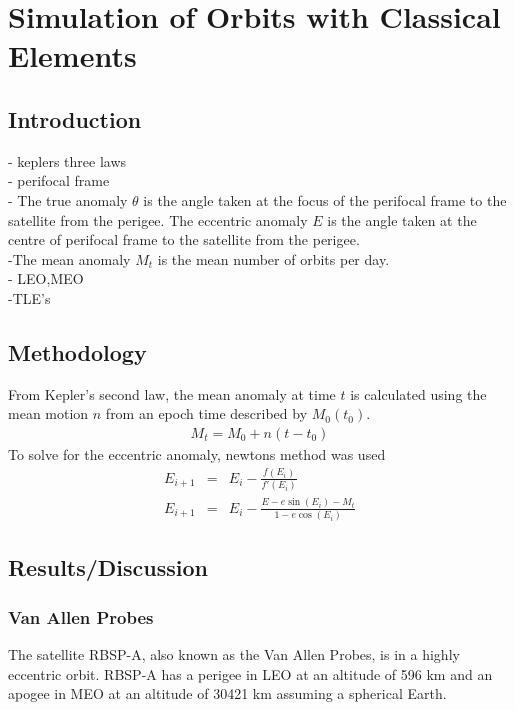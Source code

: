 \documentclass[Space3_Assign1.tex]{subfiles}
\begin{document}
\section{Simulation of Orbits with Classical Elements}
\subsection{Introduction}
- keplers three laws\\
- perifocal frame\\
- The true anomaly $\theta$ is the angle taken at the focus of the perifocal frame to the satellite from the perigee. The eccentric anomaly $\textit{E}$ is the angle taken at the centre of perifocal frame to the satellite from the perigee.\\
-The mean anomaly \textit{$M_t$} is the mean number of orbits per day.\\
- LEO,MEO\\
-TLE's \\



\subsection{Methodology}
From Kepler's second law, the mean anomaly at time $\textit{t}$ is calculated using the mean motion $\textit{n}$ from an epoch time described by $M_0(t_0)$. 
\begin{eqnarray}
M_t = M_0 + n(t-t_0)
\end{eqnarray}
To solve for the eccentric anomaly, newtons method was used
\begin{eqnarray}
E_{i+1} &=& E_i - \frac{f(E_i)}{f'(E_i)}\\
E_{i+1} &=& E_i - \frac{E-e\sin(E_i)-M_t}{1-e\cos(E_i)}
\end{eqnarray}


\subsection{Results/Discussion}
\subsubsection{Van Allen Probes}
The satellite RBSP-A, also known as the Van Allen Probes, is in a highly eccentric orbit. RBSP-A has a perigee in LEO at an altitude of 596 km and an apogee in MEO at an altitude of 30421 km assuming a spherical Earth. 
\end{document}
